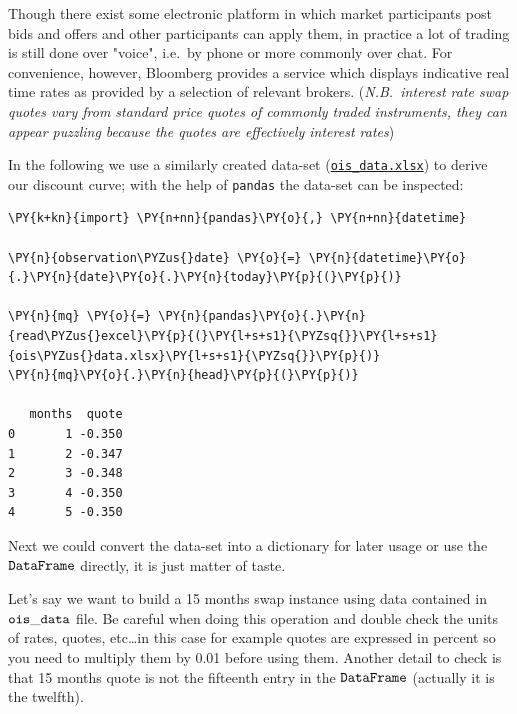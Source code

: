 Though there exist some electronic platform in which market participants post bids and offers and other participants can apply them, in practice a lot of trading is still done over "voice", i.e.~by phone or more
commonly over chat. For convenience, however, Bloomberg provides a service which displays indicative real time rates as provided by a selection of relevant brokers. (\emph{N.B.~interest rate swap quotes vary from standard price quotes of commonly traded instruments, they can appear puzzling because the quotes are effectively interest rates})

In the following we use a similarly created data-set (\href{https://drive.google.com/file/d/1LCEDmheKqwPXFpJ25hFz32QI5im2UJO1/view?usp=sharing}{\texttt{ois\_data.xlsx}}) to derive our discount curve; with the help of \texttt{pandas} the data-set can be inspected:

\begin{tcolorbox}[breakable, size=fbox, boxrule=1pt, pad at break*=1mm,colback=cellbackground, colframe=cellborder]
\begin{Verbatim}[commandchars=\\\{\}]
\PY{k+kn}{import} \PY{n+nn}{pandas}\PY{o}{,} \PY{n+nn}{datetime}

\PY{n}{observation\PYZus{}date} \PY{o}{=} \PY{n}{datetime}\PY{o}{.}\PY{n}{date}\PY{o}{.}\PY{n}{today}\PY{p}{(}\PY{p}{)}

\PY{n}{mq} \PY{o}{=} \PY{n}{pandas}\PY{o}{.}\PY{n}{read\PYZus{}excel}\PY{p}{(}\PY{l+s+s1}{\PYZsq{}}\PY{l+s+s1}{ois\PYZus{}data.xlsx}\PY{l+s+s1}{\PYZsq{}}\PY{p}{)}
\PY{n}{mq}\PY{o}{.}\PY{n}{head}\PY{p}{(}\PY{p}{)}

   months  quote
0       1 -0.350
1       2 -0.347
2       3 -0.348
3       4 -0.350
4       5 -0.350
\end{Verbatim}
\end{tcolorbox}

Next we could convert the data-set into a dictionary for later usage or
use the \(\tt{DataFrame}\) directly, it is just matter of taste.

Let's say we want to build a 15 months swap instance using data
contained in \(\tt{ois\_data}\) file. Be careful when doing this
operation and double check the units of rates, quotes, etc\ldots{}in
this case for example quotes are expressed in percent so you need to
multiply them by 0.01 before using them. Another detail to check is that
15 months quote is not the fifteenth entry in the \(\tt{DataFrame}\)
(actually it is the twelfth).


